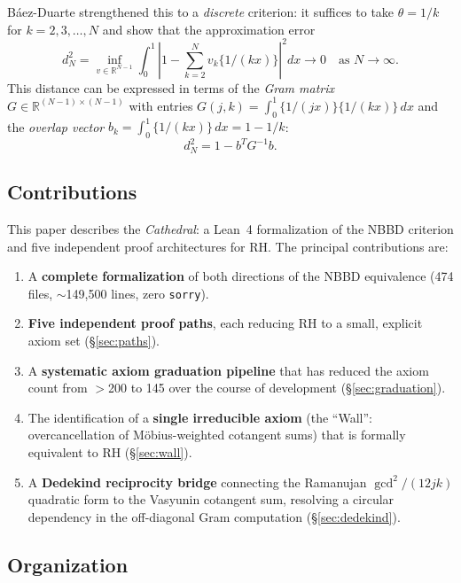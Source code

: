 \documentclass[11pt,a4paper]{article}
\theoremstyle{definition}
\newcommand{\sorry}{\texttt{sorry}}
\newcommand{\fract}[1]{\{#1\}}
\begin{document}
B\'aez-Duarte \cite{baezduarte2003} strengthened this to a
\emph{discrete} criterion: it suffices to take $\theta = 1/k$ for
$k = 2, 3, \ldots, N$ and show that the approximation error
\[
  d_N^2 = \inf_{v \in \mathbb{R}^{N-1}}
  \int_0^1 \left| 1 - \sum_{k=2}^{N} v_k \fract{1/(kx)} \right|^2 dx
  \to 0 \quad \text{as } N \to \infty.
\]
This distance can be expressed in terms of the \emph{Gram matrix}
$G \in \mathbb{R}^{(N-1) \times (N-1)}$ with entries
$G(j,k) = \int_0^1 \fract{1/(jx)} \fract{1/(kx)}\, dx$
and the \emph{overlap vector} $b_k = \int_0^1 \fract{1/(kx)}\, dx = 1 - 1/k$:
\[
  d_N^2 = 1 - b^T G^{-1} b.
\]

\subsection{Contributions}

This paper describes the \emph{Cathedral}: a Lean~4 formalization of
the NBBD criterion and five independent proof architectures for RH.
The principal contributions are:

\begin{enumerate}[label=(\roman*)]
  \item A \textbf{complete formalization} of both directions of the
    NBBD equivalence (474 files, $\sim$149,500 lines, zero \sorry{}).

  \item \textbf{Five independent proof paths}, each reducing RH to
    a small, explicit axiom set (\S\ref{sec:paths}).

  \item A \textbf{systematic axiom graduation pipeline} that has
    reduced the axiom count from $>$200 to 145 over the course of
    development (\S\ref{sec:graduation}).

  \item The identification of a \textbf{single irreducible axiom}
    (the ``Wall'': overcancellation of M\"obius-weighted cotangent
    sums) that is formally equivalent to RH (\S\ref{sec:wall}).

  \item A \textbf{Dedekind reciprocity bridge} connecting the
    Ramanujan $\gcd^2/(12jk)$ quadratic form to the Vasyunin
    cotangent sum, resolving a circular dependency in the
    off-diagonal Gram computation (\S\ref{sec:dedekind}).
\end{enumerate}

\subsection{Organization}
\end{document}
